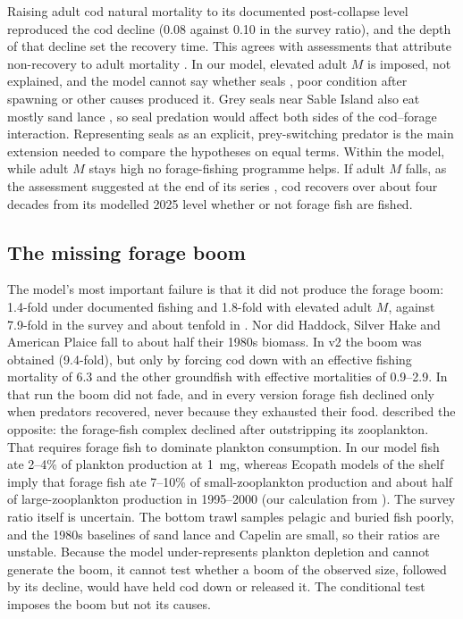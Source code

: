 \documentclass[12pt,letterpaper,fleqn]{article}
\begin{document}
Raising adult cod natural mortality to its documented post-collapse level reproduced the cod decline (0.08 against 0.10 in the survey ratio), and the depth of that decline set the recovery time. This agrees with assessments that attribute non-recovery to adult mortality \autocite{fu2001why,swain2012forage,mohn2012laurentian}. In our model, elevated adult $M$ is imposed, not explained, and the model cannot say whether seals \autocite{trzcinski2006continued,oboyle2012seal}, poor condition after spawning \autocite{dutil2000natural} or other causes produced it. Grey seals near Sable Island also eat mostly sand lance \autocite{bowen1994offshore}, so seal predation would affect both sides of the cod--forage interaction. Representing seals as an explicit, prey-switching predator is the main extension needed to compare the hypotheses on equal terms. Within the model, while adult $M$ stays high no forage-fishing programme helps. If adult $M$ falls, as the assessment suggested at the end of its series \autocite{mohn2012laurentian}, cod recovers over about four decades from its modelled 2025 level whether or not forage fish are fished.

\subsection{The missing forage boom}

The model's most important failure is that it did not produce the forage boom: 1.4-fold under documented fishing and 1.8-fold with elevated adult $M$, against 7.9-fold in the survey and about tenfold in \textcite{frank2011transient}. Nor did Haddock, Silver Hake and American Plaice fall to about half their 1980s biomass. In v2 the boom was obtained (9.4-fold), but only by forcing cod down with an effective fishing mortality of 6.3 and the other groundfish with effective mortalities of 0.9--2.9. In that run the boom did not fade, and in every version forage fish declined only when predators recovered, never because they exhausted their food. \textcite{frank2011transient} described the opposite: the forage-fish complex declined after outstripping its zooplankton. That requires forage fish to dominate plankton consumption. In our model fish ate 2--4\% of plankton production at 1~mg, whereas Ecopath models of the shelf imply that forage fish ate 7--10\% of small-zooplankton production and about half of large-zooplankton production in 1995--2000 (our calculation from \citeauthor{bundy2004mass} \citeyear{bundy2004mass}). The survey ratio itself is uncertain. The bottom trawl samples pelagic and buried fish poorly, and the 1980s baselines of sand lance and Capelin are small, so their ratios are unstable. Because the model under-represents plankton depletion and cannot generate the boom, it cannot test whether a boom of the observed size, followed by its decline, would have held cod down or released it. The conditional test imposes the boom but not its causes.
\end{document}
